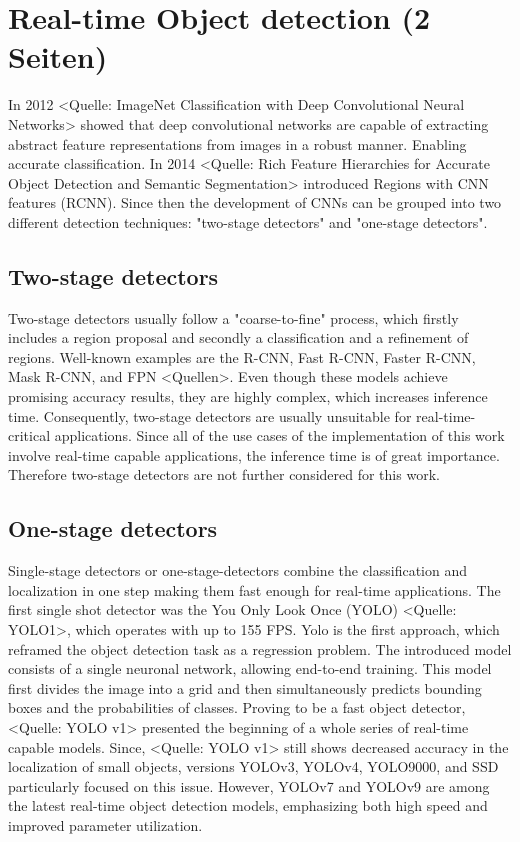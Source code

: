 \section{Real-time Object detection (2 Seiten)}
\label{sec:ObjectDetection}

In 2012 <Quelle: ImageNet Classification with Deep Convolutional Neural Networks> showed that deep convolutional networks are capable of extracting abstract feature representations from images in a robust manner.
Enabling accurate classification.
In 2014 <Quelle: Rich Feature Hierarchies for Accurate Object Detection and Semantic Segmentation> introduced Regions with CNN features (RCNN).
Since then the development of CNNs can be grouped into two different detection techniques: "two-stage detectors" and "one-stage detectors".

\subsection{Two-stage detectors}

Two-stage detectors usually follow a "coarse-to-fine" process, which firstly includes a region proposal and secondly a classification and a refinement of regions.
Well-known examples are the R-CNN, Fast R-CNN, Faster R-CNN, Mask R-CNN, and FPN <Quellen>.
Even though these models achieve promising accuracy results, they are highly complex, which increases inference time.
Consequently, two-stage detectors are usually unsuitable for real-time-critical applications.
Since all of the use cases of the implementation of this work involve real-time capable applications, the inference time is of great importance.
Therefore two-stage detectors are not further considered for this work.

\subsection{One-stage detectors}

Single-stage detectors or one-stage-detectors combine the classification and localization in one step making them fast enough for real-time applications.
The first single shot detector was the You Only Look Once (YOLO) <Quelle: YOLO1>, which operates with up to 155 FPS.
Yolo is the first approach, which reframed the object detection task as a regression problem.
The introduced model consists of a single neuronal network, allowing end-to-end training.
This model first divides the image into a grid and then simultaneously predicts bounding boxes and the probabilities of classes.
Proving to be a fast object detector, <Quelle: YOLO v1> presented the beginning of a whole series of real-time capable models.
Since, <Quelle: YOLO v1> still shows decreased accuracy in the localization of small objects, versions YOLOv3, YOLOv4, YOLO9000, and SSD particularly focused on this issue.
However, YOLOv7 and YOLOv9 are among the latest real-time object detection models, emphasizing both high speed and improved parameter utilization.

